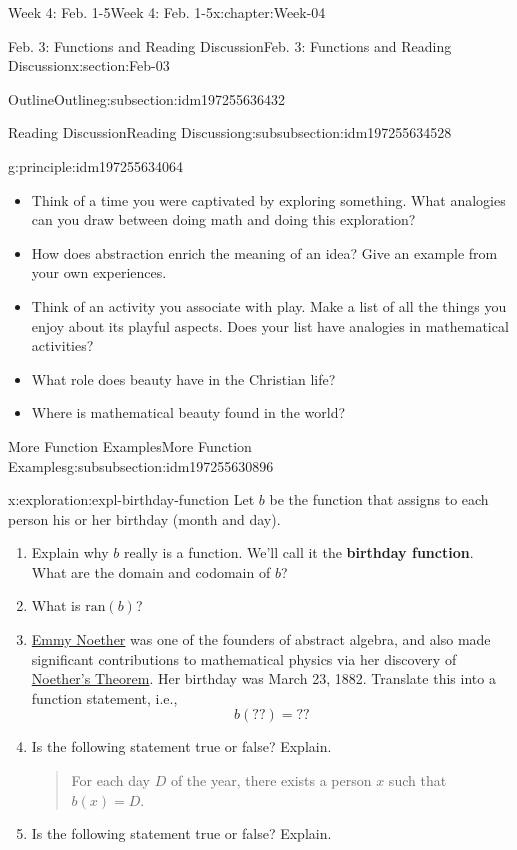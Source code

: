 \documentclass[oneside,10pt,]{book}
\newcommand{\terminology}[1]{\textbf{#1}}
\numberwithin{equation}{section}
\def\ran{\text{ran}}
\begin{document}
\begin{chapterptx}{Week 4: Feb. 1-5}{}{Week 4: Feb. 1-5}{}{}{x:chapter:Week-04}
\begin{sectionptx}{Feb. 3: Functions and Reading Discussion}{}{Feb. 3: Functions and Reading Discussion}{}{}{x:section:Feb-03}
\begin{subsectionptx}{Outline}{}{Outline}{}{}{g:subsection:idm197255636432}
\begin{subsubsectionptx}{Reading Discussion}{}{Reading Discussion}{}{}{g:subsubsection:idm197255634528}
\begin{principle}{}{}{g:principle:idm197255634064}
\begin{itemize}[label=\textbullet]
\item{}Think of a time you were captivated by exploring something. What analogies can you draw between doing math and doing this exploration?%
\item{}How does abstraction enrich the meaning of an idea? Give an example from your own experiences.%
\item{}Think of an activity you associate with play. Make a list of all the things you enjoy about its playful aspects. Does your list have analogies in mathematical activities?%
\item{}What role does beauty have in the Christian life?%
\item{}Where is mathematical beauty found in the world?%
\end{itemize}
\end{principle}
\end{subsubsectionptx}
%
%
\typeout{************************************************}
\typeout{************************************************}
%
\begin{subsubsectionptx}{More Function Examples}{}{More Function Examples}{}{}{g:subsubsection:idm197255630896}
\begin{exploration}{}{x:exploration:expl-birthday-function}%
Let \(b\) be the function that assigns to each person his or her birthday (month and day).%
%
\begin{enumerate}
\item{}Explain why \(b\) really is a function. We'll call it the \terminology{birthday function}.  What are the domain and codomain of \(b\)?%
\item{}What is \(\ran(b)\)?%
\item{}\href{https://en.wikipedia.org/wiki/Emmy_Noether}{Emmy Noether} was one of the founders of abstract algebra, and also made significant contributions to mathematical physics via her discovery of \href{https://en.wikipedia.org/wiki/Noether\%27s_theorem}{Noether's Theorem}. Her birthday was March 23, 1882. Translate this into a function statement, i.e.,%
\begin{equation*}
b(??) = ??
\end{equation*}
%
\item{}Is the following statement true or false? Explain. \begin{quote}%
For each day \(D\) of the year, there exists a person \(x\) such that \(b(x)=D\).\end{quote}
%
\item{}Is the following statement true or false? Explain. \begin{quote}%

\end{quote}
\end{enumerate}
\end{exploration}
\end{subsubsectionptx}
\end{subsectionptx}
\end{sectionptx}
\end{chapterptx}
\end{document}
